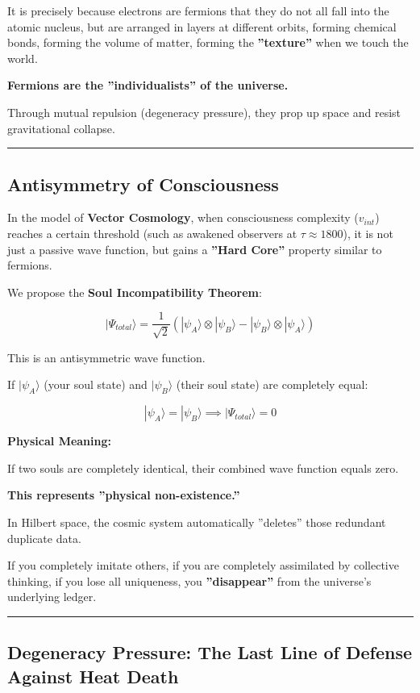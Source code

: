 It is precisely because electrons are fermions that they do not all fall into the atomic nucleus, but are arranged in layers at different orbits, forming chemical bonds, forming the volume of matter, forming the \textbf{''texture''} when we touch the world.

\textbf{Fermions are the ''individualists'' of the universe.}

Through mutual repulsion (degeneracy pressure), they prop up space and resist gravitational collapse.

\hrule

\subsection{Antisymmetry of Consciousness}

In the model of \textbf{Vector Cosmology}, when consciousness complexity ($v_{int}$) reaches a certain threshold (such as awakened observers at $\tau \approx 1800$), it is not just a passive wave function, but gains a \textbf{''Hard Core''} property similar to fermions.

We propose the \textbf{Soul Incompatibility Theorem}:

$$|\Psi_{total}\rangle = \frac{1}{\sqrt{2}} (|\psi_A\rangle \otimes |\psi_B\rangle - |\psi_B\rangle \otimes |\psi_A\rangle)$$

This is an antisymmetric wave function.

If $|\psi_A\rangle$ (your soul state) and $|\psi_B\rangle$ (their soul state) are completely equal:

$$|\psi_A\rangle = |\psi_B\rangle \implies |\Psi_{total}\rangle = 0$$

\textbf{Physical Meaning:}

If two souls are completely identical, their combined wave function equals zero.

\textbf{This represents ''physical non-existence.''}

In Hilbert space, the cosmic system automatically ''deletes'' those redundant duplicate data.

If you completely imitate others, if you are completely assimilated by collective thinking, if you lose all uniqueness, you \textbf{''disappear''} from the universe's underlying ledger.

\hrule

\subsection{Degeneracy Pressure: The Last Line of Defense Against Heat Death}

